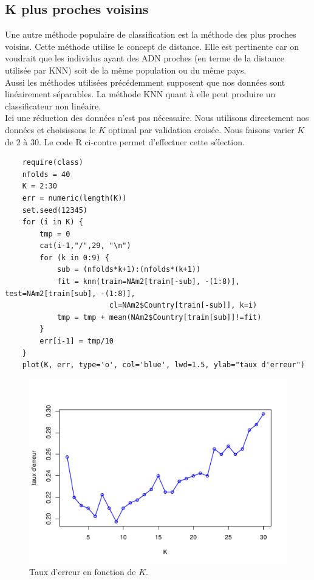 \documentclass[12pt,a4paper]{article}
\begin{document}
\subsection{K plus proches voisins}
Une autre méthode populaire de classification est la méthode des plus proches
voisins. Cette méthode utilise le concept de distance. Elle est
pertinente car on voudrait que les individus ayant des ADN proches (en terme
de la distance utilisée par KNN) soit de la même population ou du même pays. \\
Aussi les méthodes utilisées précédemment supposent que nos données
sont linéairement séparables. La méthode KNN quant à elle peut produire un
classificateur non linéaire.\vspace{3mm}\\
Ici une réduction des données n'est pas nécessaire. Nous utilisons directement
nos données et choisissons le $K$ optimal par validation croisée. Nous
faisons varier $K$ de 2 à 30. Le code R ci-contre permet d'effectuer cette
sélection.\vspace{2mm}
\begin{lstlisting}
	require(class)
	nfolds = 40
	K = 2:30
	err = numeric(length(K))
	set.seed(12345)
	for (i in K) {
		tmp = 0
		cat(i-1,"/",29, "\n")
		for (k in 0:9) {
			sub = (nfolds*k+1):(nfolds*(k+1))
			fit = knn(train=NAm2[train[-sub], -(1:8)], test=NAm2[train[sub], -(1:8)],
						cl=NAm2$Country[train[-sub]], k=i)
			tmp = tmp + mean(NAm2$Country[train[sub]]!=fit)
		}
		err[i-1] = tmp/10
	}
	plot(K, err, type='o', col='blue', lwd=1.5, ylab="taux d'erreur")
\end{lstlisting}
\begin{figure}[h!]
	\begin{center}
		\includegraphics[scale=0.6]{figures/kopt.pdf}
		\caption{Taux d'erreur en fonction de $K$.}
		\label{fig:kopt}
	\end{center}
\end{figure}
\end{document}
